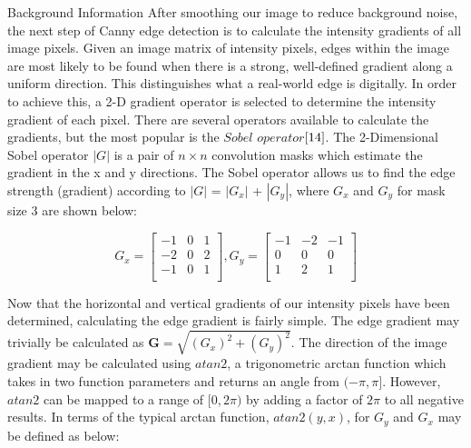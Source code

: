 \documentclass[a4paper,12pt]{article}
\begin{document}
\begin{section}{Background Information}
After smoothing our image to reduce background noise, the next step of Canny edge detection is to calculate the intensity gradients of all image pixels. Given an image matrix of intensity pixels, edges within the image are most likely to be found when there is a strong, well-defined gradient along a uniform direction. This distinguishes what a real-world edge is digitally. In order to achieve this, a 2-D gradient operator is selected to determine the intensity gradient of each pixel. There are several operators available to calculate the gradients, but the most popular is the $Sobel$ $operator$$\cite{14}$.%
The 2-Dimensional Sobel operator $|G|$ is a pair of $n\times n$ convolution masks which estimate the gradient in the x and y directions. The Sobel operator allows us to find the edge strength (gradient) according to $|G|$ = $|G_x|$ + $|G_y|$, where $G_x$ and $G_y$ for mask size 3 are shown below:

\singlespacing
\begin{center}
\[G_x = 
\begin{bmatrix}
-1 & 0 & 1\\
-2 & 0 & 2\\
-1 & 0 & 1\\
\end{bmatrix}
, G_y =
\begin{bmatrix}
-1 & -2 & -1\\
0 & 0 & 0\\
1 & 2 & 1\\
\end{bmatrix}
\]
\end{center}
\doublespacing

Now that the horizontal and vertical gradients of our intensity pixels have been determined, calculating the edge gradient is fairly simple.
The edge gradient may trivially be calculated as $\textbf{G} = \sqrt{(G_x)^2 + (G_y)^2}$. 
The direction of the image gradient may be calculated using $atan2$, a trigonometric arctan function which takes in two function parameters and returns an angle from $(-\pi,\pi]$.
However, $atan2$ can be mapped to a range of $[0,2\pi)$ by adding a factor of $2\pi$ to all negative results.
In terms of the typical arctan function, $atan2(y,x)$, for $G_y$ and $G_x$ may be defined as below:


\end{section}
\end{document}
